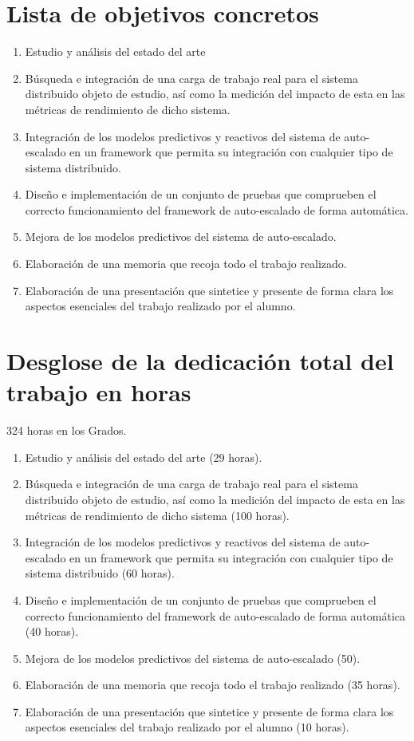 \documentclass[12pt,a4paper, english]{article}
\begin{document}
\section{Lista de objetivos concretos}
\begin{enumerate}
    \item Estudio y análisis del estado del arte
    \item Búsqueda e integración de una carga de trabajo real para el sistema distribuido objeto de estudio, así como la medición del impacto de esta en las métricas de rendimiento de dicho sistema.
    \item Integración de los modelos predictivos y reactivos del sistema de auto-escalado en un framework que permita su integración con cualquier tipo de sistema distribuido.
    \item Diseño e implementación de un conjunto de pruebas que comprueben el correcto funcionamiento del framework de auto-escalado de forma automática.
    \item Mejora de los modelos predictivos del sistema de auto-escalado.
    \item Elaboración de una memoria que recoja todo el trabajo realizado.
    \item Elaboración de una presentación que sintetice y presente de forma clara los aspectos esenciales del trabajo realizado por el alumno.
\end{enumerate}

\section{Desglose de la dedicación total del trabajo en horas}
324 horas en los Grados.
\begin{enumerate}
    \item Estudio y análisis del estado del arte (29 horas).
    \item Búsqueda e integración de una carga de trabajo real para el sistema distribuido objeto de estudio, así como la medición del impacto de esta en las métricas de rendimiento de dicho sistema (100 horas).
    \item Integración de los modelos predictivos y reactivos del sistema de auto-escalado en un framework que permita su integración con cualquier tipo de sistema distribuido (60 horas).
    \item Diseño e implementación de un conjunto de pruebas que comprueben el correcto funcionamiento del framework de auto-escalado de forma automática (40 horas).
    \item Mejora de los modelos predictivos del sistema de auto-escalado (50).
    \item Elaboración de una memoria que recoja todo el trabajo realizado (35 horas).
    \item Elaboración de una presentación que sintetice y presente de forma clara los aspectos esenciales del trabajo realizado por el alumno (10 horas).
\end{enumerate}
\end{document}
